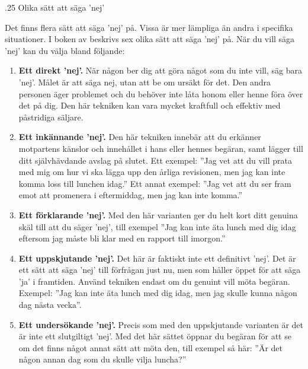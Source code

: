 \documentclass[swedish,a4paper]{book}
\makeatletter
\renewcommand\subsection{\@startsection{subsection}{1}{\z@}%
                                   {\baselineskip}%
                                   {.25\baselineskip}%
                                   {\fontsize{1\baselineskip}{1.25\baselineskip}\selectfont\sffamily\bfseries}} %
\makeatother
\begin{document}
\subsection{Olika sätt att säga 'nej'}

Det finns flera sätt att säga 'nej' på. Vissa är mer lämpliga än andra i specifika situationer. I boken  av \textcite{powell1997free} beskrivs sex olika sätt att säga 'nej' på. När du vill säga 'nej' kan du välja bland följande:

\begin{enumerate}

\item \textbf{Ett direkt 'nej'.} När någon ber dig att göra något som du inte vill, säg bara 'nej'. Målet är att säga nej, utan att be om ursäkt för det. Den andra personen äger problemet och du behöver inte låta honom eller henne föra över det på dig. Den här tekniken kan vara mycket kraftfull och effektiv med påstridiga säljare.

\item \textbf{Ett inkännande 'nej'.} Den här tekniken innebär att du erkänner motpartens känslor och innehållet i hans eller hennes begäran, samt lägger till ditt självhävdande avslag på slutet. Ett exempel: ''Jag vet att du vill prata med mig om hur vi ska lägga upp den årliga revisionen, men jag kan inte komma loss till lunchen idag.'' Ett annat exempel: ''Jag vet att du ser fram emot att promenera i eftermiddag, men jag kan inte komma.''

\item \textbf{Ett förklarande 'nej'.} Med den här varianten ger du helt kort ditt genuina skäl till att du säger 'nej', till exempel ''Jag kan inte äta lunch med dig idag eftersom jag måste bli klar med en rapport till imorgon.''

\item \textbf{Ett uppskjutande 'nej'.} Det här är faktiskt inte ett definitivt 'nej'. Det är ett sätt att säga 'nej' till förfrågan just nu, men som håller öppet för att säga 'ja' i framtiden. Använd tekniken endast om du genuint vill möta begäran. Exempel: ''Jag kan inte äta lunch med dig idag, men jag skulle kunna någon dag nästa vecka''.

\item \textbf{Ett undersökande 'nej'.} Precis som med den uppskjutande varianten är det är inte ett slutgiltigt 'nej'. Med det här sättet öppnar du begäran för att se om det finns något annat sätt att möta den, till exempel så här: ''Är det någon annan dag som du skulle vilja luncha?''


\end{enumerate}
\end{document}
